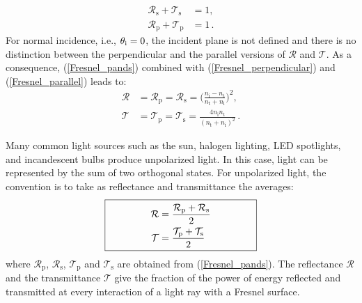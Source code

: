\begin{equation}
\begin{split}
\mathcal{R}_\textrm{s}+\mathcal{T}_\textrm{s} &= 1,\\
\mathcal{R}_\textrm{p}+\mathcal{T}_\textrm{p} &=1\,.
\end{split}
\end{equation}
For normal incidence, i.e., $\theta_\textrm{i} = 0$, the incident plane is not defined and there is no distinction between the perpendicular and the parallel versions of $\mathcal{R}$ and $\mathcal{T}$. As a consequence, (\ref{Fresnel_pands}) combined with (\ref{Fresnel_perpendicular}) and (\ref{Fresnel_parallel}) leads to:
\begin{equation}\label{eq:fresnel_pands2}
\begin{split}
\mathcal{R} &= \mathcal{R}_\textrm{p} = \mathcal{R}_\textrm{s} = \Bigg(\frac{n_\textrm{i}-n_\textrm{t}}{n_\textrm{t}+n_\textrm{i}}\Bigg)^2, \\
\mathcal{T} &= \mathcal{T}_\textrm{p} = \mathcal{T}_\textrm{s} = \frac{4n_\textrm{i} n_\textrm{t}}{(n_\textrm{t}+n_\textrm{i})^2}\,.
\end{split}
\end{equation}

Many common light sources such as the sun, halogen lighting, LED spotlights, and incandescent bulbs produce unpolarized light. 
In this case, light can be represented by the sum of two orthogonal states. For unpolarized light, the convention is to take as reflectance and transmittance the averages:
\begin{equation}
\fbox{\begin{minipage}{15em}
\begin{equation*}\begin{split}
\mathcal{R} &= \frac{\mathcal{R}_\textrm{p}+ \mathcal{R}_\textrm{s}}{2}\\
\mathcal{T} &= \frac{\mathcal{T}_\textrm{p}+ \mathcal{T}_\textrm{s}}{2}
\end{split}
\label{eq:RandTin2D}
\end{equation*}
\end{minipage}}
\end{equation}
where $\mathcal{R}_\textrm{p}$, $\mathcal{R}_\textrm{s}$, $\mathcal{T}_\textrm{p}$ and $\mathcal{T}_\textrm{s}$ are obtained from (\ref{Fresnel_pands}). The reflectance $\mathcal{R}$ and the transmittance $\mathcal{T}$ give the fraction of the power of energy reflected and transmitted at every interaction of a light ray with a Fresnel surface.


